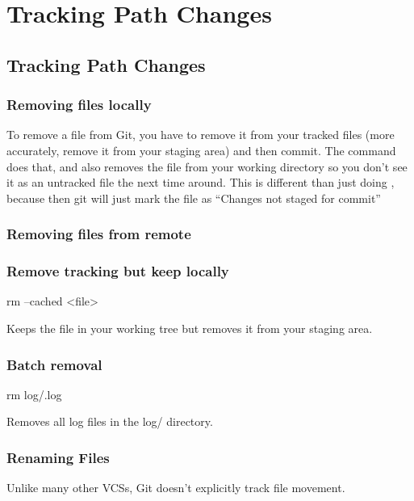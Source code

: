 
\chapter{Tracking Path Changes}
\chapteroverlay
\section{Tracking Path Changes}

\subsection{Removing files locally}
To remove a file from Git, you have to remove it from your tracked files (more accurately, remove it from your staging area) and then commit. The  command does that, and also removes the file from your working directory so you don’t see it as an untracked file the next time around.\newline
This is different than just doing , because then git will just mark the file as “Changes not staged for commit”

\subsection{Removing files from remote}

\subsection{Remove tracking but keep locally}

\begin{gitBashBox}
rm --cached <file>    
\end{gitBashBox}
Keeps the file in your working tree but removes it from your staging area.

\subsection{Batch removal}
\begin{gitBashBox}
rm log/\*.log
\end{gitBashBox}\footnotemark
Removes all log files in the log/ directory.




\subsection{Renaming Files}
Unlike many other VCSs, Git doesn’t explicitly track file movement.

